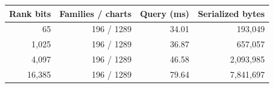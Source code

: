 \begin{tabular}{rrrr}\toprule
Rank bits & Families / charts & Query (ms) & Serialized bytes\\\midrule
65 & 196 / 1289 & 34.01 & 193,049\\
1,025 & 196 / 1289 & 36.87 & 657,057\\
4,097 & 196 / 1289 & 46.58 & 2,093,985\\
16,385 & 196 / 1289 & 79.64 & 7,841,697\\
\bottomrule\end{tabular}
